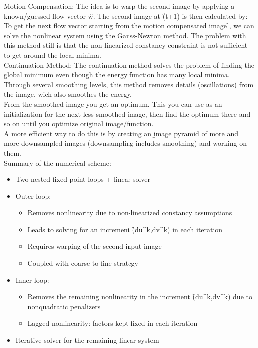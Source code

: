 \b{Motion Compensation:} The idea is to warp the second image by applying a known/guessed flow vector \f{w}. The second image at \f{(t+1)} is then calculated by:
To get the next flow vector starting from the motion compensated image \f{}, we can solve the nonlinear system using the Gauss-Newton method. The problem with this method still is that the non-linearized constancy constraint is not sufficient to get around the local minima.\\

\b{Continuation Method:} The continuation method solves the problem of finding the global minimum even though the energy function has many local minima. Through several smoothing levels, this method removes details (oscillations) from the image, wich also smoothes the energy.\\

From the smoothed image you get an optimum. This you can use as an initialization for the next less smoothed image, then find the optimum there and so on until you optimize original image/function.\\

A more efficient way to do this is by creating an \b{image pyramid} of more and more downsampled images (downsampling includes smoothing) and working on them.\\

\b{Summary of the numerical scheme:}
\begin{itemize}
    \item Two nested fixed point loops + linear solver
    \item Outer loop:
    \begin{itemize}
        \item Removes nonlinearity due to non-linearized constancy assumptions
        \item Leads to solving for an increment \f{(du^k,dv^k)} in each iteration
        \item Requires warping of the second input image
        \item Coupled with coarse-to-fine strategy
    \end{itemize}
    \item Inner loop:
    \begin{itemize}
        \item Removes the remaining nonlinearity in the increment \f{(du^k,dv^k)} due to nonquadratic penalizers
        \item Lagged nonlinearity: factors kept fixed in each iteration
    \end{itemize}
    \item Iterative solver for the remaining linear system
\end{itemize}


